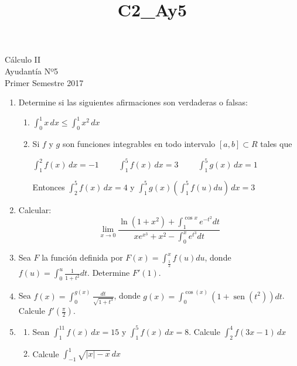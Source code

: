 \documentclass[letterpaper,10pt]{article}
\title{C2_Ay5}
\newcommand{\dis}{\displaystyle}
\def\sin{\operatorname{sen}}
\providecommand{\abs}[1]{\lvert#1\rvert}
\begin{document}
\begin{center}
Cálculo II\\
Ayudantía Nº5\\
Primer Semestre 2017
\end{center}



\begin{enumerate}
\item Determine si las siguientes afirmaciones son verdaderas o falsas:
\begin{enumerate}[label=\emph{\alph*)}]
\item $\dis \int_0^1 x\, dx \leq \int_0^1 x^2\, dx$
\item Si $f$ y $g$ son funciones integrables en todo intervalo $[a,b] \subset R$ tales que
\begin{center}
$\dis \int_1^2 f(x)\, dx=-1  \hspace{1cm}  \int_1^5 f(x)\, dx=3 \hspace{1cm} \dis \int_1^5 g(x)\, dx=1 $
\end{center}
Entonces $\dis \int_2^5 f(x)\, dx=4$ \hspace{2mm} y \hspace{2mm} $\dis \int_1^5 g(x)\left(\int_1^5 f(u)du\right)  \, dx=3$
\end{enumerate}
\vspace{2mm}


\item Calcular: \\
\[ \lim_{x \to 0} \frac{\ln(1+x^2)+\dis \int_1^{\cos x} e^{-t^2}dt}{xe^{x^3}+x^2-\dis \int_0^{x}e^{t^3}dt}\]
\vspace{2mm}

\item Sea $F$ la función definida por $\dis F(x)= \int_{\frac{1}{2}}^{x}f(u)du$, donde $\dis f(u)= \int_0^u \frac{1}{1+t^2}dt$. Determine $F'(1)$.
\vspace{2mm}

\item Sea $\dis f(x)= \int_{0}^{g(x)} \frac{dt}{\sqrt{1+t^3}}$, donde $\dis g(x)= \int_{0}^{\cos(x)} \left(1+ \sin (t^2)\right)dt$. Calcule $\dis f'\left(\frac{\pi}{2}\right)$.
\vspace{4mm}


\item 
\begin{enumerate}[label=\emph{\alph*)}]
\item Sean $\dis \int_1^{11} f(x)\, dx = 15$ y $\dis \int_1^{5} f(x)\, dx = 8$. Calcule $\dis \int_2^{4} f(3x-1)\, dx$
\item Calcule $\dis \int_{-1}^{1} \sqrt{\abs{x}-x} \, dx$
\end{enumerate}




\end{enumerate}




\vspace{10mm}
\end{document}
